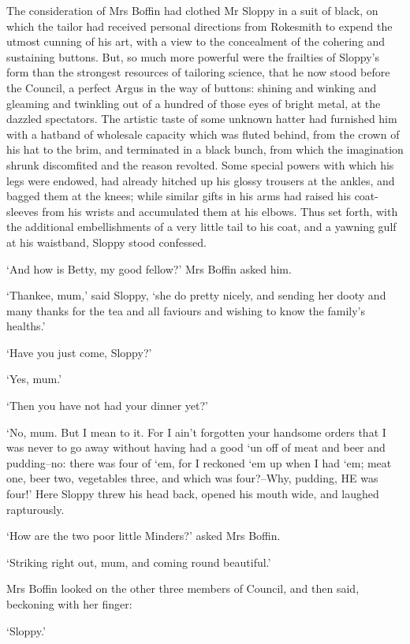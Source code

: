The consideration of Mrs Boffin had clothed Mr Sloppy in a suit of
black, on which the tailor had received personal directions from
Rokesmith to expend the utmost cunning of his art, with a view to the
concealment of the cohering and sustaining buttons. But, so much
more powerful were the frailties of Sloppy’s form than the strongest
resources of tailoring science, that he now stood before the Council,
a perfect Argus in the way of buttons: shining and winking and gleaming
and twinkling out of a hundred of those eyes of bright metal, at the
dazzled spectators. The artistic taste of some unknown hatter had
furnished him with a hatband of wholesale capacity which was fluted
behind, from the crown of his hat to the brim, and terminated in a black
bunch, from which the imagination shrunk discomfited and the reason
revolted. Some special powers with which his legs were endowed, had
already hitched up his glossy trousers at the ankles, and bagged them at
the knees; while similar gifts in his arms had raised his coat-sleeves
from his wrists and accumulated them at his elbows. Thus set forth, with
the additional embellishments of a very little tail to his coat, and a
yawning gulf at his waistband, Sloppy stood confessed.

‘And how is Betty, my good fellow?’ Mrs Boffin asked him.

‘Thankee, mum,’ said Sloppy, ‘she do pretty nicely, and sending her
dooty and many thanks for the tea and all faviours and wishing to know
the family’s healths.’

‘Have you just come, Sloppy?’

‘Yes, mum.’

‘Then you have not had your dinner yet?’

‘No, mum. But I mean to it. For I ain’t forgotten your handsome orders
that I was never to go away without having had a good ‘un off of meat
and beer and pudding--no: there was four of ‘em, for I reckoned ‘em
up when I had ‘em; meat one, beer two, vegetables three, and which was
four?--Why, pudding, HE was four!’ Here Sloppy threw his head back,
opened his mouth wide, and laughed rapturously.

‘How are the two poor little Minders?’ asked Mrs Boffin.

‘Striking right out, mum, and coming round beautiful.’

Mrs Boffin looked on the other three members of Council, and then said,
beckoning with her finger:

‘Sloppy.’

